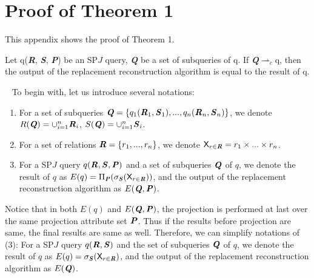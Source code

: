 \section{Proof of Theorem 1}
    This appendix shows the proof of Theorem 1.
    \begin{Theorem}
        Let q(\textbf{\textit{R}}, \textbf{\textit{S}}, \textbf{\textit{P}}) be an SP$J$ query, \textbf{\textit{Q}} be a set of subqueries of q. If \textbf{\textit{Q}}$\rightharpoonup_c$q, then the output of the replacement reconstruction algorithm is equal to the result of q.
    \end{Theorem}
    \begin{Proof}
        \ \newline 
        \indent To begin with, let us introduce several notations:
        \begin{enumerate}[leftmargin = 15pt]
            \item For a set of subqueries $\textbf{\textit{Q}}=\{q_1(\textbf{\textit{R}}_1,\textbf{\textit{S}}_1),...,q_n(\textbf{\textit{R}}_n,\textbf{\textit{S}}_n)\}$, we denote $R(\textbf{\textit{Q}})=\cup_{i=1}^n \textbf{\textit{R}}_i$, $S(\textbf{\textit{Q}})=\cup_{i=1}^n \textbf{\textit{S}}_i$.
            \item For a set of relations $\textbf{\textit{R}}=\{r_1,...,r_n\}$, we denote $\mathsf{X}_{r \in \textbf{\textit{R}}}=r_1 \times ... \times r_n$.
            \item For a SP$J$ query $q(\textbf{\textit{R}},\textbf{\textit{S}},\textbf{\textit{P}})$ and a set of subqueries $\textbf{\textit{Q}}$ of $q$, we denote the result of $q$ as $E(q)=\Pi_{\textbf{\textit{P}}}(\sigma_{\textbf{\textit{S}}}(\mathsf{X}_{r \in \textbf{\textit{R}}}))$, and the output of the replacement reconstruction algorithm as $E(\textbf{\textit{Q}}, \textbf{\textit{P}})$.
        \end{enumerate}\par
        \indent Notice that in both $E(q)$ and $E(\textbf{\textit{Q}}, \textbf{\textit{P}})$, the projection is performed at last over the same projection attribute set $\textbf{\textit{P}}$. Thus if the results before projection are same, the final results are same as well. Therefore, we can simplify notations of (3): For a SP$J$ query $q(\textbf{\textit{R}},\textbf{\textit{S}})$ and the set of subqueries $\textbf{\textit{Q}}$ of $q$, we denote the result of $q$ as $E(q)=\sigma_{\textbf{\textit{S}}}(\mathsf{X}_{r \in \textbf{\textit{R}}})$, and the output of the replacement reconstruction algorithm as $E(\textbf{\textit{Q}})$.

\end{Proof}
